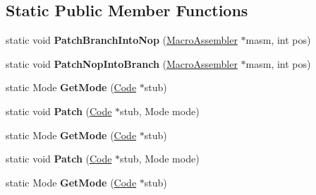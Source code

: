 \subsection*{Static Public Member Functions}
\begin{DoxyCompactItemize}
\item 
static void {\bfseries Patch\+Branch\+Into\+Nop} (\hyperlink{classv8_1_1internal_1_1_macro_assembler}{Macro\+Assembler} $\ast$masm, int pos)\hypertarget{classv8_1_1internal_1_1_record_write_stub_a50dd0cf37a008b46bcedb2350c39a3a1}{}\label{classv8_1_1internal_1_1_record_write_stub_a50dd0cf37a008b46bcedb2350c39a3a1}

\item 
static void {\bfseries Patch\+Nop\+Into\+Branch} (\hyperlink{classv8_1_1internal_1_1_macro_assembler}{Macro\+Assembler} $\ast$masm, int pos)\hypertarget{classv8_1_1internal_1_1_record_write_stub_a55df913981d78a9535b78d8894a33bd7}{}\label{classv8_1_1internal_1_1_record_write_stub_a55df913981d78a9535b78d8894a33bd7}

\item 
static Mode {\bfseries Get\+Mode} (\hyperlink{classv8_1_1internal_1_1_code}{Code} $\ast$stub)\hypertarget{classv8_1_1internal_1_1_record_write_stub_af0f27fcc028caac49bec6438383cd51e}{}\label{classv8_1_1internal_1_1_record_write_stub_af0f27fcc028caac49bec6438383cd51e}

\item 
static void {\bfseries Patch} (\hyperlink{classv8_1_1internal_1_1_code}{Code} $\ast$stub, Mode mode)\hypertarget{classv8_1_1internal_1_1_record_write_stub_ac3c961dc847aeabf6b3d8034de93c8a1}{}\label{classv8_1_1internal_1_1_record_write_stub_ac3c961dc847aeabf6b3d8034de93c8a1}

\item 
static Mode {\bfseries Get\+Mode} (\hyperlink{classv8_1_1internal_1_1_code}{Code} $\ast$stub)\hypertarget{classv8_1_1internal_1_1_record_write_stub_af0f27fcc028caac49bec6438383cd51e}{}\label{classv8_1_1internal_1_1_record_write_stub_af0f27fcc028caac49bec6438383cd51e}

\item 
static void {\bfseries Patch} (\hyperlink{classv8_1_1internal_1_1_code}{Code} $\ast$stub, Mode mode)\hypertarget{classv8_1_1internal_1_1_record_write_stub_ac3c961dc847aeabf6b3d8034de93c8a1}{}\label{classv8_1_1internal_1_1_record_write_stub_ac3c961dc847aeabf6b3d8034de93c8a1}

\item 
static Mode {\bfseries Get\+Mode} (\hyperlink{classv8_1_1internal_1_1_code}{Code} $\ast$stub)\hypertarget{classv8_1_1internal_1_1_record_write_stub_af0f27fcc028caac49bec6438383cd51e}{}\label{classv8_1_1internal_1_1_record_write_stub_af0f27fcc028caac49bec6438383cd51e}


\end{DoxyCompactItemize}

